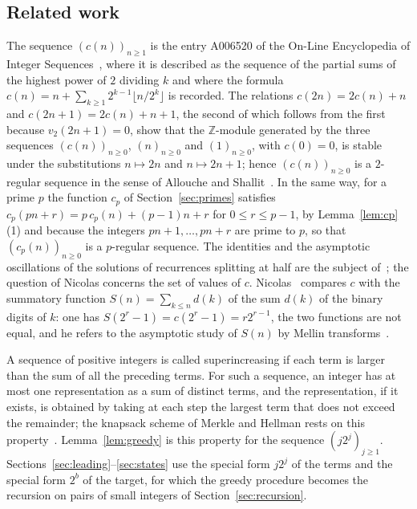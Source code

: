 \documentclass[11pt]{amsart}
\theoremstyle{definition}
\begin{document}
\subsection{Related work}
\label{subsec:related}
The sequence $(c(n))_{n\ge1}$ is the entry A006520 of the On-Line Encyclopedia of Integer Sequences~\cite{oeisA006520}, where it is described as the sequence of the partial sums of the highest power of $2$ dividing $k$ and where the formula $c(n)=n+\sum_{k\ge1}2^{k-1}\lfloor n/2^k\rfloor$ is recorded. The relations $c(2n)=2c(n)+n$ and $c(2n+1)=2c(n)+n+1$, the second of which follows from the first because $v_2(2n+1)=0$, show that the $\mathbb{Z}$-module generated by the three sequences $(c(n))_{n\ge0}$, $(n)_{n\ge0}$ and $(1)_{n\ge0}$, with $c(0)=0$, is stable under the substitutions $n\mapsto2n$ and $n\mapsto2n+1$; hence $(c(n))_{n\ge0}$ is a $2$-regular sequence in the sense of Allouche and Shallit~\cite{alloucheshallit1992}. In the same way, for a prime $p$ the function $c_p$ of Section~\ref{sec:primes} satisfies $c_p(pn+r)=p\,c_p(n)+(p-1)n+r$ for $0\le r\le p-1$, by Lemma~\ref{lem:cp}(1) and because the integers $pn+1,\dots,pn+r$ are prime to $p$, so that $(c_p(n))_{n\ge0}$ is a $p$-regular sequence. The identities and the asymptotic oscillations of the solutions of recurrences splitting at half are the subject of~\cite{hwangjansontsai2024}; the question of Nicolas concerns the set of values of $c$. Nicolas~\cite{nicolas2005open} compares $c$ with the summatory function $S(n)=\sum_{k\le n}d(k)$ of the sum $d(k)$ of the binary digits of $k$: one has $S(2^r-1)=c(2^r-1)=r2^{r-1}$, the two functions are not equal, and he refers to the asymptotic study of $S(n)$ by Mellin transforms~\cite{flajoletetal1994}.

A sequence of positive integers is called superincreasing if each term is larger than the sum of all the preceding terms. For such a sequence, an integer has at most one representation as a sum of distinct terms, and the representation, if it exists, is obtained by taking at each step the largest term that does not exceed the remainder; the knapsack scheme of Merkle and Hellman rests on this property~\cite{merklehellman1978}. Lemma~\ref{lem:greedy} is this property for the sequence $(j2^j)_{j\ge1}$. Sections~\ref{sec:leading}--\ref{sec:states} use the special form $j2^j$ of the terms and the special form $2^b$ of the target, for which the greedy procedure becomes the recursion on pairs of small integers of Section~\ref{sec:recursion}.
\end{document}

